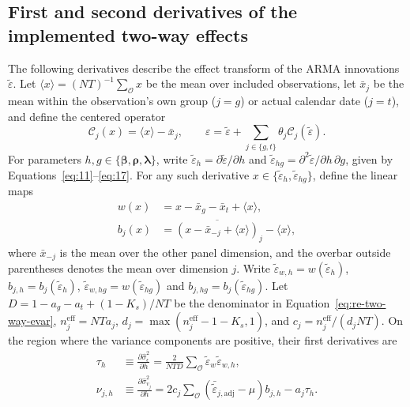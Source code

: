 \documentclass[12pt]{article}
\begin{document}
\subsection{First and second derivatives of the implemented two-way effects}
The following derivatives describe the effect transform of the ARMA innovations $\tilde{\varepsilon}$. Let $\langle x\rangle=(NT)^{-1}\sum_{\mathcal O}x$ be the mean over included observations, let $\bar{x}_{j}$ be the mean within the observation's own group ($j=g$) or actual calendar date ($j=t$), and define the centered operator
\begin{equation}
\mathcal C_j(x)=\langle x\rangle-\bar{x}_{j},\qquad
\varepsilon=\tilde{\varepsilon}+\sum_{j\in\{g,t\}}\theta_j\mathcal C_j(\tilde{\varepsilon}).
\label{eq:re-two-way-transform}
\end{equation}
For parameters $h,g\in\{\boldsymbol{\beta},\boldsymbol{\rho},\boldsymbol{\lambda}\}$, write $\tilde{\varepsilon}_h=\partial\tilde{\varepsilon}/\partial h$ and $\tilde{\varepsilon}_{hg}=\partial^2\tilde{\varepsilon}/\partial h\,\partial g$, given by Equations~\ref{eq:11}--\ref{eq:17}. For any such derivative $x\in\{\tilde{\varepsilon}_h,\tilde{\varepsilon}_{hg}\}$, define the linear maps
\begin{align}
w(x)&=x-\bar{x}_{g}-\bar{x}_{t}+\langle x\rangle,\\
b_{j}(x)&=\overline{\left(x-\bar{x}_{-j}+\langle x\rangle\right)}_{j}-\langle x\rangle,
\label{eq:re-two-way-input-derivatives}
\end{align}
where $\bar{x}_{-j}$ is the mean over the other panel dimension, and the overbar outside parentheses denotes the mean over dimension $j$. Write $\tilde{\varepsilon}_{w,h}=w(\tilde{\varepsilon}_h)$, $b_{j,h}=b_j(\tilde{\varepsilon}_h)$, $\tilde{\varepsilon}_{w,hg}=w(\tilde{\varepsilon}_{hg})$ and $b_{j,hg}=b_j(\tilde{\varepsilon}_{hg})$. Let $D=1-a_g-a_t+(1-K_s)/NT$ be the denominator in Equation~\ref{eq:re-two-way-evar}, $n_j^{\mathrm{eff}}=NTa_j$, $d_j=\max(n_j^{\mathrm{eff}}-1-K_s,1)$, and $c_j=n_j^{\mathrm{eff}}/(d_jNT)$. On the region where the variance components are positive, their first derivatives are
\begin{align}
\tau_h
&\equiv\frac{\partial\widehat{\sigma}_{\epsilon}^{2}}{\partial h}
=\frac{2}{NTD}\sum_{\mathcal O}\tilde{\varepsilon}_w\tilde{\varepsilon}_{w,h},
\label{eq:re-two-way-tau-first}\\
\nu_{j,h}
&\equiv\frac{\partial\widehat{\sigma}_{v_j}^{2}}{\partial h}
=2c_j\sum_{\mathcal O}(\bar{\tilde{\varepsilon}}_{j,\mathrm{adj}}-\mu)b_{j,h}-a_j\tau_h.
\label{eq:re-two-way-nu-first}
\end{align}
\end{document}
